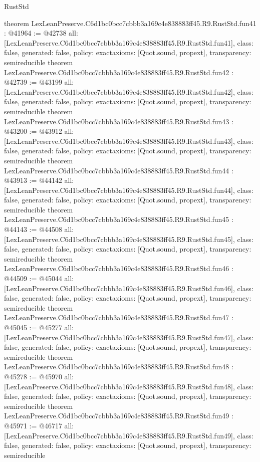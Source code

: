 \begin{lexlean}{RustStd}
\begin{coremodule}
{}
theorem LexLeanPreserve.C6d1bc0bcc7cbbb3a169c4e838883ff45.R9.RustStd.fun41 : @41964 := @42738 {
  all: [LexLeanPreserve.C6d1bc0bcc7cbbb3a169c4e838883ff45.R9.RustStd.fun41],
  class: false,
  generated: false,
  policy: exact{axioms: [Quot.sound, propext]},
  transparency: semireducible
}
theorem LexLeanPreserve.C6d1bc0bcc7cbbb3a169c4e838883ff45.R9.RustStd.fun42 : @42739 := @43199 {
  all: [LexLeanPreserve.C6d1bc0bcc7cbbb3a169c4e838883ff45.R9.RustStd.fun42],
  class: false,
  generated: false,
  policy: exact{axioms: [Quot.sound, propext]},
  transparency: semireducible
}
theorem LexLeanPreserve.C6d1bc0bcc7cbbb3a169c4e838883ff45.R9.RustStd.fun43 : @43200 := @43912 {
  all: [LexLeanPreserve.C6d1bc0bcc7cbbb3a169c4e838883ff45.R9.RustStd.fun43],
  class: false,
  generated: false,
  policy: exact{axioms: [Quot.sound, propext]},
  transparency: semireducible
}
theorem LexLeanPreserve.C6d1bc0bcc7cbbb3a169c4e838883ff45.R9.RustStd.fun44 : @43913 := @44142 {
  all: [LexLeanPreserve.C6d1bc0bcc7cbbb3a169c4e838883ff45.R9.RustStd.fun44],
  class: false,
  generated: false,
  policy: exact{axioms: [Quot.sound, propext]},
  transparency: semireducible
}
theorem LexLeanPreserve.C6d1bc0bcc7cbbb3a169c4e838883ff45.R9.RustStd.fun45 : @44143 := @44508 {
  all: [LexLeanPreserve.C6d1bc0bcc7cbbb3a169c4e838883ff45.R9.RustStd.fun45],
  class: false,
  generated: false,
  policy: exact{axioms: [Quot.sound, propext]},
  transparency: semireducible
}
theorem LexLeanPreserve.C6d1bc0bcc7cbbb3a169c4e838883ff45.R9.RustStd.fun46 : @44509 := @45044 {
  all: [LexLeanPreserve.C6d1bc0bcc7cbbb3a169c4e838883ff45.R9.RustStd.fun46],
  class: false,
  generated: false,
  policy: exact{axioms: [Quot.sound, propext]},
  transparency: semireducible
}
theorem LexLeanPreserve.C6d1bc0bcc7cbbb3a169c4e838883ff45.R9.RustStd.fun47 : @45045 := @45277 {
  all: [LexLeanPreserve.C6d1bc0bcc7cbbb3a169c4e838883ff45.R9.RustStd.fun47],
  class: false,
  generated: false,
  policy: exact{axioms: [Quot.sound, propext]},
  transparency: semireducible
}
theorem LexLeanPreserve.C6d1bc0bcc7cbbb3a169c4e838883ff45.R9.RustStd.fun48 : @45278 := @45970 {
  all: [LexLeanPreserve.C6d1bc0bcc7cbbb3a169c4e838883ff45.R9.RustStd.fun48],
  class: false,
  generated: false,
  policy: exact{axioms: [Quot.sound, propext]},
  transparency: semireducible
}
theorem LexLeanPreserve.C6d1bc0bcc7cbbb3a169c4e838883ff45.R9.RustStd.fun49 : @45971 := @46717 {
  all: [LexLeanPreserve.C6d1bc0bcc7cbbb3a169c4e838883ff45.R9.RustStd.fun49],
  class: false,
  generated: false,
  policy: exact{axioms: [Quot.sound, propext]},
  transparency: semireducible
}
\end{coremodule}
\end{lexlean}
